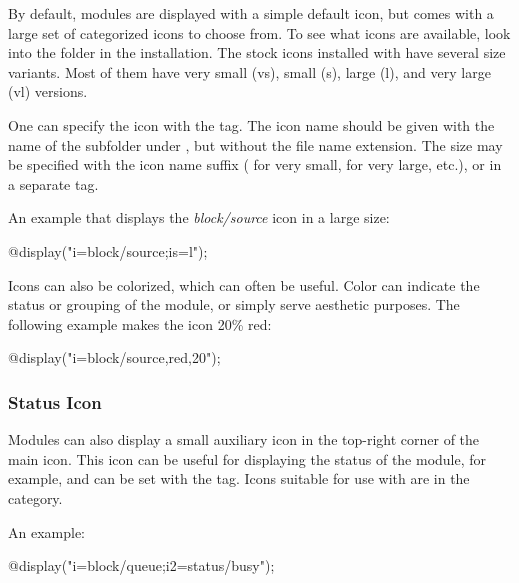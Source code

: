By default, modules are displayed with a simple default icon, but {\opp} comes
with a large set of categorized icons to choose from. To see what icons are
available, look into the  folder in the {\opp} installation. The
stock icons installed with {\opp} have several size variants. Most of them have
very small (vs), small (s), large (l), and very large (vl) versions.

One can specify the icon with the  tag. The icon name should be given
with the name of the subfolder under , but without the file name
extension. The size may be specified with the icon name suffix ( for
very small,  for very large, etc.), or in a separate  tag.

An example that displays the \textit{block/source} icon in a large size:

\begin{ned}
@display("i=block/source;is=l");
\end{ned}

Icons can also be colorized, which can often be useful. Color can indicate the
status or grouping of the module, or simply serve aesthetic purposes. The
following example makes the icon 20\% red:

\begin{ned}
@display("i=block/source,red,20");
\end{ned}

\begin{center}
\end{center}

\subsubsection{Status Icon}
\label{sec:graphics:submodule-status-icon}

Modules can also display a small auxiliary icon in the top-right corner of the
main icon. This icon can be useful for displaying the status of the module, for
example, and can be set with the  tag. Icons suitable for use with
 are in the  category.

An example:

\begin{ned}
@display("i=block/queue;i2=status/busy");
\end{ned}

\begin{center}
\end{center}

